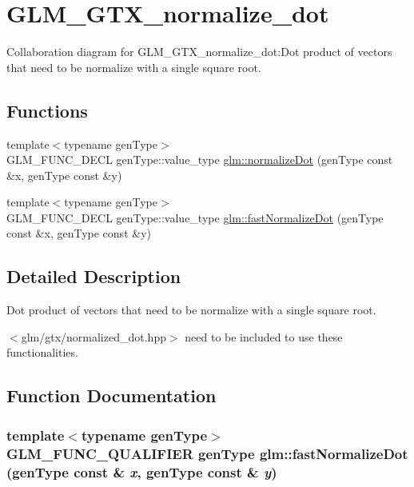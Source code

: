 \hypertarget{group__gtx__normalize__dot}{
\section{GLM\_\-GTX\_\-normalize\_\-dot}
\label{group__gtx__normalize__dot}
}


Collaboration diagram for GLM\_\-GTX\_\-normalize\_\-dot:Dot product of vectors that need to be normalize with a single square root.  
\subsection*{Functions}
\begin{CompactItemize}
\item 
{\footnotesize template$<$typename genType$>$ }\\GLM\_\-FUNC\_\-DECL genType::value\_\-type \hyperlink{group__gtx__normalize__dot_g068b0c92713a438533628dd5d0b581d4}{glm::normalizeDot} (genType const \&x, genType const \&y)
\item 
{\footnotesize template$<$typename genType$>$ }\\GLM\_\-FUNC\_\-DECL genType::value\_\-type \hyperlink{group__gtx__normalize__dot_gb3967681366216d96699232dd5e86d31}{glm::fastNormalizeDot} (genType const \&x, genType const \&y)
\end{CompactItemize}


\subsection{Detailed Description}
Dot product of vectors that need to be normalize with a single square root. 

$<$glm/gtx/normalized\_\-dot.hpp$>$ need to be included to use these functionalities. 

\subsection{Function Documentation}
\hypertarget{group__gtx__normalize__dot_gb3967681366216d96699232dd5e86d31}{
\subsubsection[fastNormalizeDot]{\setlength{\rightskip}{0pt plus 5cm}template$<$typename genType$>$ GLM\_\-FUNC\_\-QUALIFIER genType glm::fastNormalizeDot (genType const \& {\em x}, \/  genType const \& {\em y})}}
\label{group__gtx__normalize__dot_gb3967681366216d96699232dd5e86d31}


